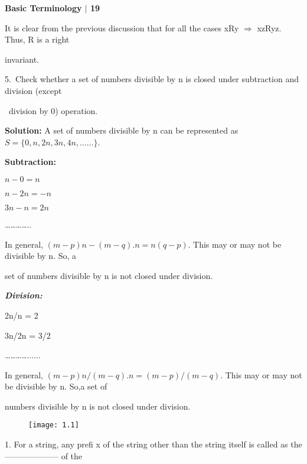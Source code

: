 \documentclass[10pt,a4paper]{book}
\begin{document}
\scriptsize

\begin{flushright}
\textsf{\textbf{Basic Terminology $|$ 19}}
\end{flushright}

It is clear from the previous discussion that for all the cases xRy $\Rightarrow$ xzRyz. Thus, R is a right

invariant.

\begin{flushleft}
  5.\, Check whether a set of numbers divisible by n is closed under subtraction and division (except

\quad\, division by 0) operation.
\end{flushleft}

\textsf{\textbf{Solution:}} A set of numbers divisible by n can be represented as $S = \{0, n, 2n, 3n, 4n,……\}$.

\textsf{\textbf{Subtraction:}}

\begin{center}
  $ n - 0 = n $

  $n - 2n =  -n$

  $3n - n = 2n$

  …………..
\end{center}

In general, $(m - p)n-(m-q).n = n(q-p)$. This may or may not be divisible by n. So, a

set of numbers divisible by n is not closed under division.

\qquad \tiny
\qquad

\textsl{\textbf{Division:}}

\begin{center}
2n/n = 2

3n/2n = 3/2

…………......
\end{center}

In general, $(m - p)n/(m-q).n = (m-p)/(m-q)$. This may or may not be divisible by n. So,a set of

numbers divisible by n is not closed under division.

\begin{figure}[h]
  \centering
  \texttt{[image: 1.1]}\\
\end{figure}

1. For a string, any prefi x of the string other than the string itself is called as the -------------------- of the
\end{document}
